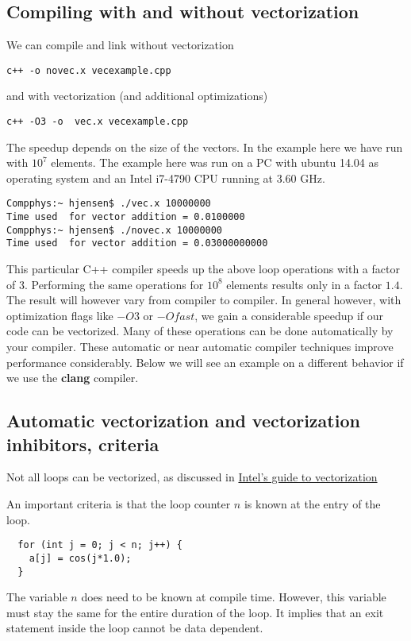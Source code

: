 \documentclass[%
oneside,                 %
final,                   %
10pt]{article}
\begin{document}
\subsection*{Compiling with and without vectorization}
We can compile and link without vectorization
\begin{verbatim}
c++ -o novec.x vecexample.cpp
\end{verbatim}
and with vectorization (and additional optimizations)
\begin{verbatim}
c++ -O3 -o  vec.x vecexample.cpp 
\end{verbatim}
The speedup depends on the size of the vectors. In the example here we have run with $10^7$ elements.
The example here was run on a PC with ubuntu 14.04 as operating system and an Intel i7-4790 CPU running at 3.60 GHz. 
\begin{verbatim}
Compphys:~ hjensen$ ./vec.x 10000000
Time used  for vector addition = 0.0100000
Compphys:~ hjensen$ ./novec.x 10000000
Time used  for vector addition = 0.03000000000
\end{verbatim}
This particular C++ compiler speeds up the above loop operations with a factor of 3. 
Performing the same operations for $10^8$ elements results only in a factor $1.4$.
The result will however vary from compiler to compiler. In general however, with optimization flags like $-O3$ or $-Ofast$, we gain a considerable speedup if our code can be vectorized. Many of these operations can be done automatically by your compiler. These automatic or near automatic compiler techniques improve performance considerably.  Below we will see an example on a different behavior if we use the \textbf{clang} compiler.

\subsection*{Automatic vectorization and vectorization inhibitors, criteria}

Not all loops can be vectorized, as discussed in \href{{https://software.intel.com/en-us/articles/a-guide-to-auto-vectorization-with-intel-c-compilers}}{Intel's guide to vectorization}

An important criteria is that the loop counter $n$ is known at the entry of the loop.
\begin{verbatim}
  for (int j = 0; j < n; j++) {
    a[j] = cos(j*1.0);
  }
\end{verbatim}
The variable $n$ does need to be known at compile time. However, this variable must stay the same for the entire duration of the loop. It implies that an exit statement inside the loop cannot be data dependent.
\end{document}

